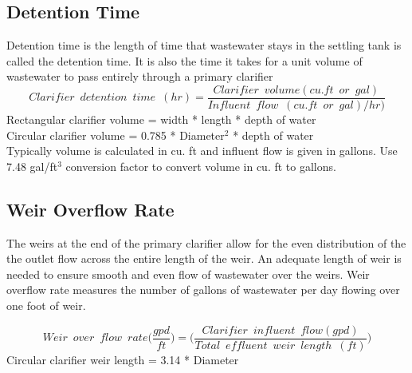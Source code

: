 \subsection{Detention Time}

Detention time is the length of time that wastewater stays in the settling tank is called the detention time.  It is also the time it takes for a unit volume of wastewater to pass entirely through a primary clarifier\\
$$Clarifier \enspace detention \enspace time \enspace (hr) = 	\dfrac{ Clarifier \enspace volume (cu.ft \enspace or \enspace gal)}{Influent \enspace flow \enspace (cu.ft \enspace or \enspace gal)/hr)}$$
Rectangular clarifier volume = width * length * depth of water\\
Circular clarifier volume = 0.785 * Diameter$^2$ * depth of water\\
Typically volume is calculated in cu. ft and influent flow is given in gallons.  Use 7.48 gal/ft$^3$ conversion factor to convert volume in cu. ft to gallons.\\

\subsection{Weir Overflow Rate}
The weirs at the end of the primary clarifier allow for the even distribution of the the outlet flow across the entire length of the weir.  An adequate length of weir is needed to ensure smooth and even flow of wastewater over the weirs.  Weir overflow rate measures the number of gallons of wastewater per day flowing over one foot of weir. 

		$$Weir \enspace over \enspace flow \enspace rate \Big(\dfrac{gpd}{ft}\Big) =\Big(\dfrac{Clarifier \enspace influent \enspace  flow (gpd)}{Total \enspace effluent 					\enspace weir \enspace length \enspace (ft)}\Big)$$
		Circular clarifier weir length = 3.14 * Diameter\\


